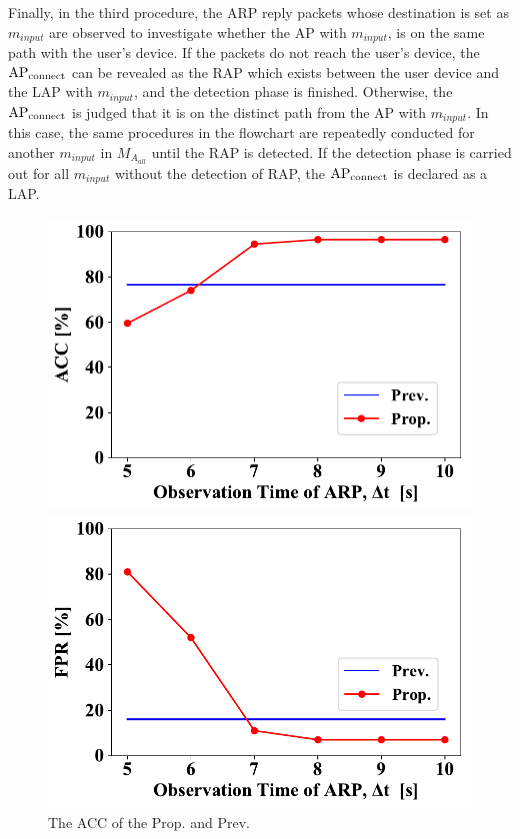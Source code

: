 \documentclass[conference]{IEEEtran}
\newcommand{\tarAP}{\rm AP_{connect}}
\newcommand{\inputMAC}{m_{input}}
\begin{document}
Finally, in the third procedure, the ARP reply packets whose destination is set as $\inputMAC$ are observed to investigate whether the AP with $\inputMAC$, is on the same path with the user's device.
If the packets do not reach the user's device, the $\tarAP$ can be revealed as the RAP which exists between the user device and the LAP with $\inputMAC$, and the detection phase is finished.
Otherwise, the $\tarAP$ is judged that it is on the distinct path from the AP with $\inputMAC$.
In this case, the same procedures in the flowchart are repeatedly conducted for another $\inputMAC$ in $M_{A_{all}}$ until the RAP is detected.
If the detection phase is carried out for all $\inputMAC$ without the detection of RAP, the $\tarAP$ is declared as a LAP. 
\begin{figure}[ht]
    \begin{minipage}{0.33\hsize}
        \begin{center}
            \includegraphics[scale=0.35]{figure/ACC.pdf}
        \end{center}
        \caption{The ACC of the Prop. and Prev.}
        \label{fig:acc}
    \end{minipage}
        \begin{minipage}{0.33\hsize}
        \begin{center}
            \includegraphics[scale=0.35]{figure/FPR.pdf}

\end{center}
\end{minipage}
\end{figure}
\end{document}
